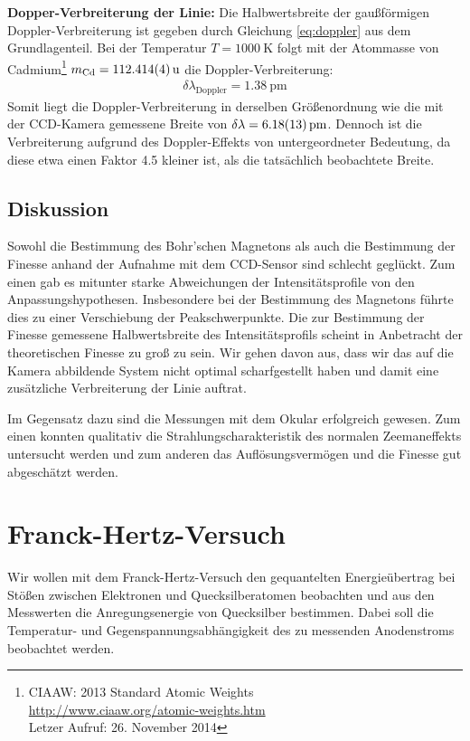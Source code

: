 \documentclass[11pt, a4paper]{article}
\begin{document}
\noindent
\textbf{Dopper-Verbreiterung der Linie:}
Die Halbwertsbreite der gaußförmigen Doppler-Verbreiterung ist gegeben durch Gleichung \ref{eq:doppler} aus dem Grundlagenteil.
Bei der Temperatur $T = \SI{1000}{\K}$ folgt mit der Atommasse von Cadmium\footnote{CIAAW: 2013 Standard Atomic Weights\\\url{http://www.ciaaw.org/atomic-weights.htm}\\Letzer Aufruf: 26. November 2014} $m_\mathrm{Cd} = \SI{112.414 +- 0.004}{\atomicmassunit} $ die Doppler-Verbreiterung:
\begin{align}
	\delta \lambda_\mathrm{Doppler} = \SI{1.38}{\pico\metre}
\end{align}
Somit liegt die Doppler-Verbreiterung in derselben Größenordnung wie die mit der CCD-Kamera gemessene Breite von $\delta \lambda = \SI{6.18 +- 0.13}{\pico\metre}$.
Dennoch ist die Verbreiterung aufgrund des Doppler-Effekts von untergeordneter Bedeutung, da diese etwa einen Faktor \num{4.5} kleiner ist, als die tatsächlich beobachtete Breite.

\subsection{Diskussion}
\label{ssec:diskussion_zeeman}
Sowohl die Bestimmung des Bohr'schen Magnetons als auch die Bestimmung der Finesse anhand der Aufnahme mit dem CCD-Sensor sind schlecht geglückt.
Zum einen gab es mitunter starke Abweichungen der Intensitätsprofile von den Anpassungshypothesen.
Insbesondere bei der Bestimmung des Magnetons führte dies zu einer Verschiebung der Peakschwerpunkte.
Die zur Bestimmung der Finesse gemessene Halbwertsbreite des Intensitätsprofils scheint in Anbetracht der theoretischen Finesse zu groß zu sein.
Wir gehen davon aus, dass wir das auf die Kamera abbildende System nicht optimal scharfgestellt haben und damit eine zusätzliche Verbreiterung der Linie auftrat.

Im Gegensatz dazu sind die Messungen mit dem Okular erfolgreich gewesen.
Zum einen konnten qualitativ die Strahlungscharakteristik des normalen Zeemaneffekts untersucht werden und zum anderen das Auflösungsvermögen und die Finesse gut abgeschätzt werden.

\section{Franck-Hertz-Versuch}

Wir wollen mit dem Franck-Hertz-Versuch den gequantelten Energieübertrag bei Stößen zwischen Elektronen und Quecksilberatomen beobachten und aus den Messwerten die Anregungsenergie von Quecksilber bestimmen.
Dabei soll die Temperatur- und Gegenspannungsabhängigkeit des zu messenden Anodenstroms beobachtet werden.
\end{document}
